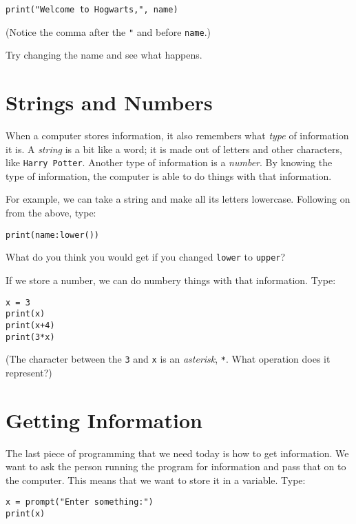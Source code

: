 \documentclass[
  xhtml,%
  use filename%
]{internet}
\begin{document}
\begin{verbatim}
print("Welcome to Hogwarts,", name)
\end{verbatim}

(Notice the comma after the \verb+"+ and before \verb+name+.)

Try changing the name and see what happens.

\section*{Strings and Numbers}

When a computer stores information, it also remembers what \emph{type} of information it is. 
A \emph{string} is a bit like a word; it is made out of letters and other characters, like \verb+Harry Potter+.
Another type of information is a \emph{number}.
By knowing the type of information, the computer is able to do things with that information.

For example, we can take a string and make all its letters lowercase.
Following on from the above, type:

\begin{verbatim}
print(name:lower())
\end{verbatim}

What do you think you would get if you changed \verb+lower+ to \verb+upper+?

\bigskip

If we store a number, we can do numbery things with that information.
Type:

\begin{verbatim}
x = 3
print(x)
print(x+4)
print(3*x)
\end{verbatim}

(The character between the \verb+3+ and \verb+x+ is an \emph{asterisk}, \verb+*+.
What operation does it represent?)

\section*{Getting Information}

The last piece of programming that we need today is how to get information.
We want to ask the person running the program for information and pass that on to the computer.
This means that we want to store it in a variable.
Type:

\begin{verbatim}
x = prompt("Enter something:")
print(x)
\end{verbatim}
\end{document}
